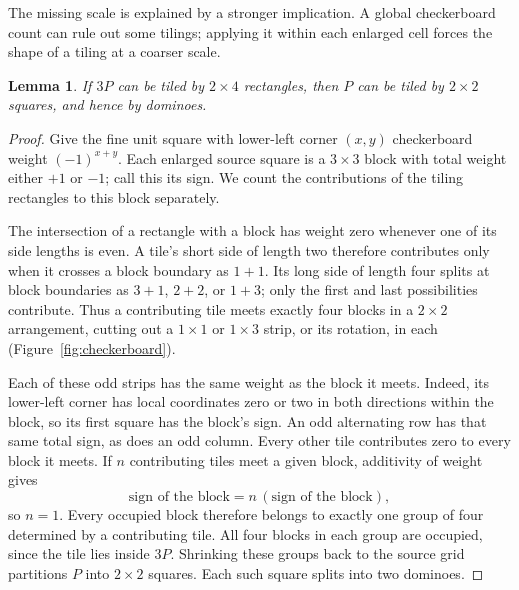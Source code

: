\documentclass[10pt,reqno]{amsart}
\newtheorem{lemma}[theorem]{Lemma}
\begin{document}
The missing scale is explained by a stronger implication. A global
checkerboard count can rule out some tilings; applying it within each
enlarged cell forces the shape of a tiling at a coarser scale.

\begin{lemma}\label{lem:three}
If $3P$ can be tiled by $2\times4$ rectangles, then $P$ can be tiled
by $2\times2$ squares, and hence by dominoes.
\end{lemma}

\begin{proof}
Give the fine unit square with lower-left corner $(x,y)$ checkerboard
weight $(-1)^{x+y}$. Each enlarged source square is a $3\times3$ block
with total weight either $+1$ or $-1$; call this its sign. We count the
contributions of the tiling rectangles to this block separately.

The intersection of a rectangle with a block has weight zero whenever
one of its side lengths is even. A tile's short side of length two
therefore contributes only when it crosses a block boundary as $1+1$.
Its long side of length four splits at block boundaries as $3+1$,
$2+2$, or $1+3$; only the first and last possibilities contribute.
Thus a contributing tile meets exactly four blocks in a $2\times2$
arrangement, cutting out a $1\times1$ or $1\times3$ strip, or its
rotation, in each (Figure~\ref{fig:checkerboard}).

Each of these odd strips has the same weight as the block it meets.
Indeed, its lower-left corner has local coordinates zero or two in
both directions within the block, so its first square has the block's
sign. An odd alternating row has that same total sign, as does an odd
column. Every other tile contributes zero to every block it meets.
If $n$ contributing tiles meet a given block, additivity of weight gives
\[
 \text{sign of the block}=n\,(\text{sign of the block}),
\]
so $n=1$. Every occupied block therefore belongs to exactly one group
of four determined by a contributing tile. All four blocks in each
group are occupied, since the tile lies inside $3P$. Shrinking these
groups back to the source grid partitions $P$ into $2\times2$ squares.
Each such square splits into two dominoes.
\end{proof}
\end{document}
